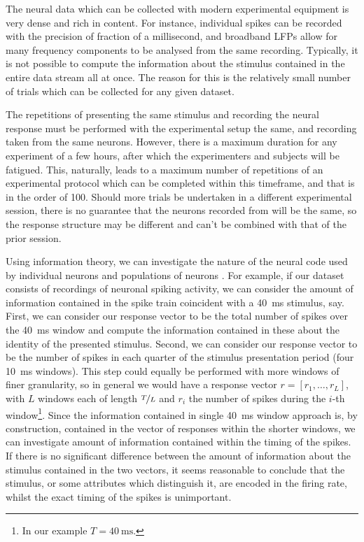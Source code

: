 The neural data which can be collected with modern experimental equipment is very dense and rich in content.
For instance, individual spikes can be recorded with the precision of fraction of a millisecond, and broadband \acp{LFP} allow for many frequency components to be analysed from the same recording.
Typically, it is not possible to compute the information about the stimulus contained in the entire data stream all at once.
The reason for this is the relatively small number of trials which can be collected for any given dataset.

The repetitions of presenting the same stimulus and recording the neural response must be performed with the experimental setup the same, and recording taken from the same neurons.
However, there is a maximum duration for any \invivo{} experiment of a few hours, after which the experimenters and subjects will be fatigued.
This, naturally, leads to a maximum number of repetitions of an experimental protocol which can be completed within this timeframe, and that is in the order of 100.
Should more trials be undertaken in a different experimental session, there is no guarantee that the neurons recorded from will be the same, so the response structure may be different and can't be combined with that of the prior session.

Using information theory, we can investigate the nature of the neural code used by individual neurons and populations of neurons \citep{Optican1987}.
For example, if our dataset consists of recordings of neuronal spiking activity, we can consider the amount of information contained in the spike train coincident with a \SI{40}{\milli\second} stimulus, say.
First, we can consider our response vector to be the total number of spikes over the \SI{40}{\milli\second} window and compute the information contained in these about the identity of the presented stimulus.
Second, we can consider our response vector to be the number of spikes in each quarter of the stimulus presentation period (four \SI{10}{\milli\second} windows).
This step could equally be performed with more windows of finer granularity, so in general we would have a response vector $r = [r_1, \ldots, r_L]$, with $L$ windows each of length $\nicefrac{T}{L}$ and $r_i$ the number of spikes during the $i$-th window\footnote{In our example $T = \SI{40}{\milli\second}$.}.
Since the information contained in single \SI{40}{\milli\second} window approach is, by construction, contained in the vector of responses within the shorter windows, we can investigate amount of information contained within the timing of the spikes.
If there is no significant difference between the amount of information about the stimulus contained in the two vectors, it seems reasonable to conclude that the stimulus, or some attributes which distinguish it, are encoded in the firing rate, whilst the exact timing of the spikes is unimportant.

